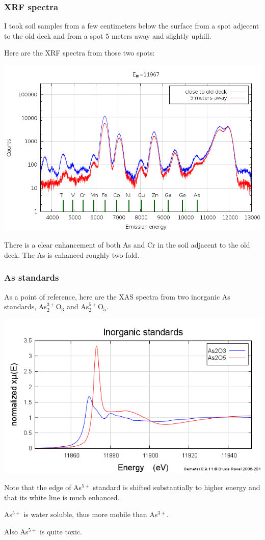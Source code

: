 \documentclass[10pt, xcolor=x11names, compress]{beamer}
\begin{document}
\begin{frame}
  \frametitle{XRF spectra}
  
  I took soil samples from a few centimeters below the surface from a
  spot adjecent to the old deck and from a spot 5 meters away and slightly
  uphill.

  \smallskip

  Here are the XRF spectra from those two spots:

  \begin{center}
    \includegraphics[width=0.65\linewidth]{garden/close_far.png}
  \end{center}

  There is a clear enhancement of both As and Cr in the soil adjacent
  to the old deck.  The As is enhanced roughly two-fold.
\end{frame}

\begin{frame}
  \frametitle{As standards}
  
  As a point of reference, here are the XAS spectra from two inorganic
  As standards, As$^{3+}_2$O$_3$ and As$^{5+}_2$O$_5$.

  \begin{center}
    \includegraphics[width=0.65\linewidth]{garden/standards.png}
  \end{center}

  Note that the edge of As$^{5+}$ standard is shifted substantially to
  higher energy and that its white line is much enhanced.

  \begin{center}
    As$^{5+}$ is water soluble, thus more mobile than As$^{3+}$.

    Also As$^{5+}$ is \alert{quite toxic}.
  \end{center}

\end{frame}
\end{document}

